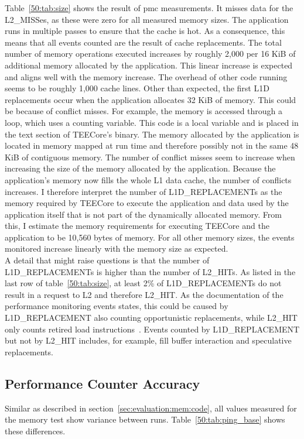 Table~\ref{50:tab:size} shows the result of \gls{pmc} measurements. It misses
data for the L2\_MISSes, as these were zero for all measured memory sizes. The
application runs in multiple passes to ensure that the cache is hot. As a
consequence, this means that all events counted are the result of cache
replacements. The total number of memory operations executed increases by
roughly 2,000 per 16 KiB of additional memory allocated by the application. This
linear increase is expected and aligns well with the memory increase. The
overhead of other code running seems to be roughly 1,000 cache lines. Other than
expected, the first L1D replacements occur when the application allocates 32 KiB
of memory. This could be because of conflict misses. For example, the memory is
accessed through a loop, which uses a counting variable. This code is a local
variable and is placed in the text section of TEECore's binary. The memory
allocated by the application is located in memory mapped at run time and
therefore possibly not in the same 48 KiB of contiguous memory. The number of
conflict misses seem to increase when increasing the size of the memory
allocated by the application. Because the application's memory now fills the
whole L1 data cache, the number of conflicts increases. I therefore interpret
the number of L1D\_REPLACEMENTs as the memory required by TEECore to execute the
application and data used by the application itself that is not part of the
dynamically allocated memory. From this, I estimate the memory requirements for
executing TEECore and the application to be 10,560 bytes of memory. For all
other memory sizes, the events monitored increase linearly with the memory size
as expected.\\

A detail that might raise questions is that the number of L1D\_REPLACEMENTs is
higher than the number of L2\_HITs. As listed in the last row of
table~\ref{50:tab:size}, at least 2\% of L1D\_REPLACEMENTs do not result in a
request to L2 and therefore L2\_HIT. As the documentation of the performance
monitoring events states, this could be caused by L1D\_REPLACEMENT also counting
opportunistic replacements, while L2\_HIT only counts retired load
instructions~\cite{perfmon}. Events counted by L1D\_REPLACEMENT but not by
L2\_HIT includes, for example, fill buffer interaction and speculative
replacements.

\FloatBarrier

\subsection{Performance Counter Accuracy}
\label{eval:mem_constraints:accu}
Similar as described in section~\ref{sec:evaluation:mem:code}, all values
measured for the memory test show variance between runs.
Table~\ref{50:tab:ping_base} shows these differences.

